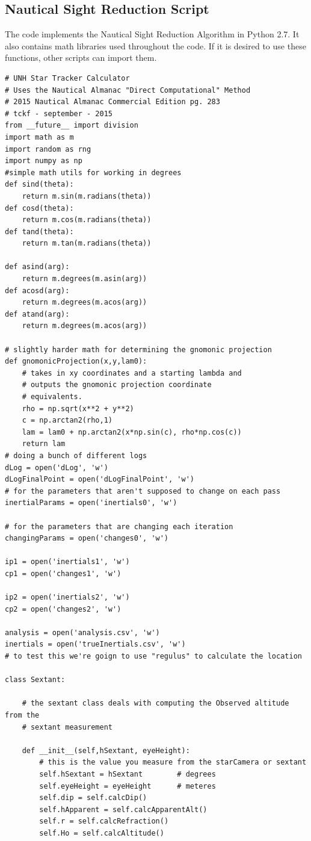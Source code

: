 \documentclass[12pt,a4paper]{book}
\begin{document}
\begin{appendices}
\chapter{Nautical Sight Reduction Script}
The code implements the Nautical Sight Reduction Algorithm in Python 2.7.  It also contains math libraries used throughout the code.  If it is desired to use these functions, other scripts can import them.  
\begin{verbatim}
# UNH Star Tracker Calculator
# Uses the Nautical Almanac "Direct Computational" Method
# 2015 Nautical Almanac Commercial Edition pg. 283
# tckf - september - 2015
from __future__ import division
import math as m
import random as rng
import numpy as np
#simple math utils for working in degrees
def sind(theta):
    return m.sin(m.radians(theta))
def cosd(theta):
    return m.cos(m.radians(theta))
def tand(theta):
    return m.tan(m.radians(theta))

def asind(arg):
    return m.degrees(m.asin(arg))
def acosd(arg):
    return m.degrees(m.acos(arg))
def atand(arg):
    return m.degrees(m.acos(arg))

# slightly harder math for determining the gnomonic projection
def gnomonicProjection(x,y,lam0):
    # takes in xy coordinates and a starting lambda and
    # outputs the gnomonic projection coordinate
    # equivalents.  
    rho = np.sqrt(x**2 + y**2)
    c = np.arctan2(rho,1)
    lam = lam0 + np.arctan2(x*np.sin(c), rho*np.cos(c))
    return lam
# doing a bunch of different logs
dLog = open('dLog', 'w')
dLogFinalPoint = open('dLogFinalPoint', 'w')
# for the parameters that aren't supposed to change on each pass
inertialParams = open('inertials0', 'w')

# for the parameters that are changing each iteration
changingParams = open('changes0', 'w')

ip1 = open('inertials1', 'w')
cp1 = open('changes1', 'w')

ip2 = open('inertials2', 'w')
cp2 = open('changes2', 'w')

analysis = open('analysis.csv', 'w')
inertials = open('trueInertials.csv', 'w')
# to test this we're goign to use "regulus" to calculate the location

class Sextant:

    # the sextant class deals with computing the Observed altitude from the 
    # sextant measurement

    def __init__(self,hSextant, eyeHeight):
        # this is the value you measure from the starCamera or sextant
        self.hSextant = hSextant        # degrees
        self.eyeHeight = eyeHeight      # meteres
        self.dip = self.calcDip()
        self.hApparent = self.calcApparentAlt()
        self.r = self.calcRefraction()
        self.Ho = self.calcAltitude()


\end{verbatim}
\end{appendices}
\end{document}
